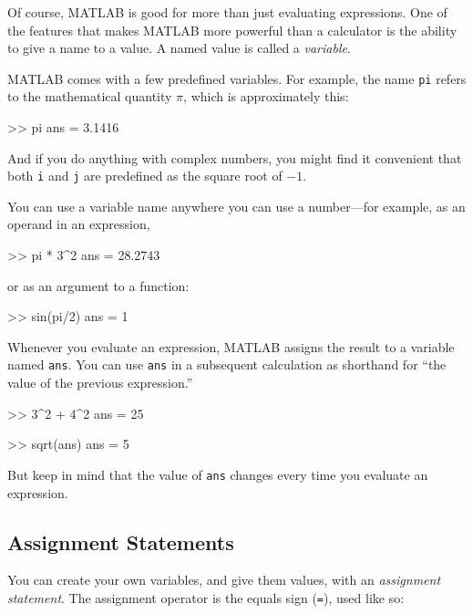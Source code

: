 Of course, MATLAB is good for more than just evaluating expressions. One of the features that makes MATLAB more powerful than a calculator is the ability to give a name to a value.  A named value is called a \emph{variable}.


MATLAB comes with a few predefined variables. For
example, the name \lstinline{pi} refers to the
mathematical quantity $\pi$, which is approximately this:

\begin{code}
>> pi
ans = 3.1416
\end{code}

And if you do anything with complex numbers, you might find it
convenient that both \lstinline{i} and \lstinline{j} are predefined as the square
root of $-1$.


You can use a variable name anywhere you can use a number---for example, as
an operand in an expression,

\begin{code}
>> pi * 3^2
ans = 28.2743
\end{code}
or as an argument to a function:

\begin{code}
>> sin(pi/2)
ans = 1
\end{code}


Whenever you evaluate an expression, MATLAB assigns the result to
a variable named \lstinline{ans}.  You can use \lstinline{ans} in a subsequent
calculation as shorthand for ``the value of the previous expression.''

\begin{code}
>> 3^2 + 4^2
ans = 25

>> sqrt(ans)
ans = 5
\end{code}

But keep in mind that the value of \lstinline{ans} changes every time
you evaluate an expression.


\subsection{Assignment Statements}

You can create your own variables, and give them values, with
an \emph{assignment statement}.  The assignment operator is the
equals sign (\lstinline{=}), used like so:


